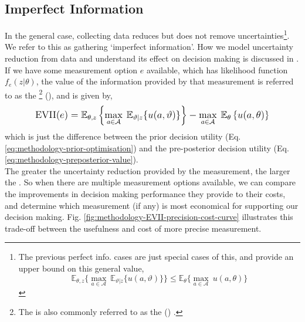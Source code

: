 \subsection{Imperfect Information}

In the general case, collecting data reduces but does not remove uncertainties\footnote{The previous perfect info. cases are just special cases of this, and provide an upper bound on this general value, \vspace*{-0.3cm}\begin{equation*} \mathbb{E}_{\theta,z} \big\lbrace \max_{a \in \mathcal{A}} \: \mathbb{E}_{\vartheta|z}\lbrace u(a,\vartheta) \rbrace \big\rbrace \leq \mathbb{E}_{\theta} \big\lbrace \max_{a \in \mathcal{A}} \: u(a,\theta) \big\rbrace \end{equation*}\vspace*{-0.55cm}}.
We refer to this as gathering `imperfect information'. How we model uncertainty reduction from data and understand its effect on decision making is discussed in . If we have some measurement option $e$ available, which has likelihood function $f_e(z|\theta)$, the value of the information provided by that measurement is referred to as the \footnote{The  is also commonly referred to as the  () \citep{keisler2014ValueInformationAnalysis}.} (), and is given by,
\begin{equation} \label{eq:evii}
    \mathlarger{
        \text{EVII}(e) =
        \mathbb{E}_{\theta,z} \left\lbrace \max_{a \in \mathcal{A}} \: \mathbb{E}_{\vartheta|z}\lbrace u(a,\vartheta) \rbrace \right\rbrace
        - \max_{a \in \mathcal{A}} \: \mathbb{E}_{\theta} \left\lbrace u(a,\theta) \right\rbrace
    }
\end{equation}
which is just the difference between the prior decision utility (Eq. \ref{eq:methodology-prior-optimisation}) and the pre-posterior decision utility (Eq. \ref{eq:methodology-preposterior-value}).\\

The greater the uncertainty reduction provided by the measurement, the larger the . So when there are multiple measurement options available, we can compare the improvements in decision making performance they provide to their costs, and determine which measurement (if any) is most economical for supporting our decision making. Fig. \ref{fig:methodology-EVII-precision-cost-curve} illustrates this trade-off between the usefulness and cost of more precise measurement.

